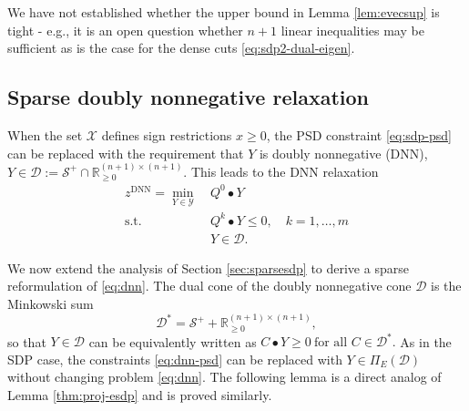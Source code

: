 \documentclass[twoside]{article}
\newcommand{\oo}[1]{{\textcolor{blue}{#1}}}
\newcommand{\ooc}[1]{{ \oo{[OG comment: #1}]}}
\newcommand{\jim}[1]{{ \oo{[Jim comment: #1}]}}
\newcommand{\matip}[2]{#1 \bullet #2}
\newcommand{\vecip}[2]{\langle #1 , #2 \rangle}
\begin{document}
		We have not established whether the upper bound in Lemma \ref{lem:evecsup} is tight - e.g., it is an open question whether $n+1$ linear inequalities may be sufficient as is the case for the dense cuts \eqref{eq:sdp2-dual-eigen}.
		
		
		
		
		\subsection{Sparse doubly nonnegative relaxation}
		
		When the set $\mathcal{X}$ defines sign restrictions $x \geq 0$, the PSD constraint \eqref{eq:sdp-psd} can be replaced with the requirement that $Y$ is doubly nonnegative (DNN), 
		$Y \in \mathcal{D} := \mathcal{S}^+ \cap \mathbb{R}_{\geq 0}^{(n+1)\times (n+1)}$. This leads to the DNN relaxation
		\begin{subequations}
			\label{eq:dnn}
			\begin{align}
				z^{\text{DNN}}= \min_{Y \in \mathcal{Y}} \ & \matip{Q^0}{Y}  \label{eq:dnn-obj}\\
				\text{s.t. } & \matip{Q^k}{Y} \leq 0, \quad k=1,\ldots, m \label{eq:dnn-cons} \\
				& Y \in \mathcal{D}.  \label{eq:dnn-psd}
			\end{align}
		\end{subequations}
		
		We now extend the analysis of Section \ref{sec:sparsesdp} to derive a sparse reformulation of \eqref{eq:dnn}. The dual cone of the doubly nonnegative cone $\mathcal{D}$ is the Minkowski sum 
		\[ \mathcal{D}^* = \mathcal{S}^+ + \mathbb{R}_{\geq 0}^{(n+1)\times (n+1)}, \]
		so that $Y \in \mathcal{D}$ can be equivalently written as $\matip{C}{Y} \geq 0~\text{for all } C \in \mathcal{D}^*.$
		As in the SDP case, the constraints \eqref{eq:dnn-psd} can be replaced with $Y \in \Pi_E(\mathcal{D})$ without changing problem \eqref{eq:dnn}. The following lemma is a direct analog of Lemma \ref{thm:proj-esdp} and is proved similarly.
		
\end{document}
